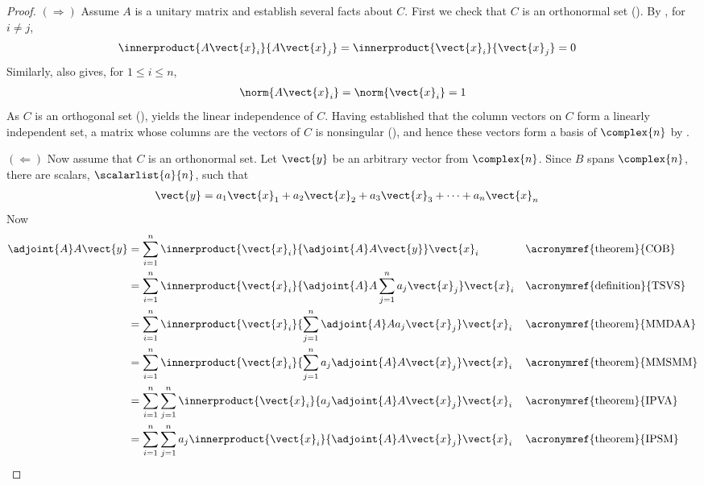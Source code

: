 \begin{proof}
%
$\left(\Rightarrow\right)$\quad
Assume $A$ is a unitary matrix and establish several facts about $C$.  First we check that $C$ is an orthonormal set ().  By , for $i\neq j$,
%
\begin{align*}
\innerproduct{A\vect{x}_i}{A\vect{x}_j}&
=\innerproduct{\vect{x}_i}{\vect{x}_j}=0
\end{align*}
%
Similarly,  also gives, for $1\leq i\leq n$,
%
\begin{align*}
\norm{A\vect{x}_i}=\norm{\vect{x}_i}=1
\end{align*}
%
As $C$ is an orthogonal set (),  yields the linear independence of $C$.  Having established that the column vectors on $C$ form a linearly independent set, a matrix whose columns are the vectors of $C$ is nonsingular (), and hence these vectors form a basis of $\complex{n}$ by .\par
%
$\left(\Leftarrow\right)$\quad
Now assume that $C$ is an orthonormal set.  Let $\vect{y}$ be an arbitrary vector from $\complex{n}$.  Since $B$ spans $\complex{n}$, there are scalars, $\scalarlist{a}{n}$, such that
%
\begin{align*}
\vect{y}&=a_1\vect{x}_1+a_2\vect{x}_2+a_3\vect{x}_3+\cdots+a_n\vect{x}_n
\end{align*}
%
Now
%
\begin{align*}
\adjoint{A}A\vect{y}
&=\sum_{i=1}^{n}\innerproduct{\vect{x}_i}{\adjoint{A}A\vect{y}}\vect{x}_i
&&\text{\acronymref{theorem}{COB}}\\
%
&=\sum_{i=1}^{n}\innerproduct{\vect{x}_i}{\adjoint{A}A\sum_{j=1}^{n}a_j\vect{x}_j}\vect{x}_i
&&\text{\acronymref{definition}{TSVS}}\\
%
&=\sum_{i=1}^{n}\innerproduct{\vect{x}_i}{\sum_{j=1}^{n}\adjoint{A}Aa_j\vect{x}_j}\vect{x}_i
&&\text{\acronymref{theorem}{MMDAA}}\\
%
&=\sum_{i=1}^{n}\innerproduct{\vect{x}_i}{\sum_{j=1}^{n}a_j\adjoint{A}A\vect{x}_j}\vect{x}_i
&&\text{\acronymref{theorem}{MMSMM}}\\
%
&=\sum_{i=1}^{n}\sum_{j=1}^{n}\innerproduct{\vect{x}_i}{a_j\adjoint{A}A\vect{x}_j}\vect{x}_i
&&\text{\acronymref{theorem}{IPVA}}\\
%
&=\sum_{i=1}^{n}\sum_{j=1}^{n}a_j\innerproduct{\vect{x}_i}{\adjoint{A}A\vect{x}_j}\vect{x}_i
&&\text{\acronymref{theorem}{IPSM}}\\

\end{align*}
\end{proof}
